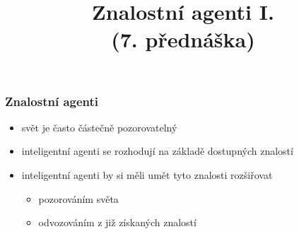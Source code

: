 \documentclass[red,professionalfont]{beamer}
\title[]{Znalostní agenti I.\\ (7. přednáška)}
\date[]{}
\theoremstyle{definition}
\newcommand{\0}{\mbox{${\bf 0}$}}
\begin{document}



\begin{frame}{} \titlepage
\end{frame}


% 

\begin{frame}\frametitle{Znalostní agenti}
\begin{itemize}
 \item svět je často částečně pozorovatelný\pause
 \item inteligentní agenti se rozhodují na základě dostupných znalostí\pause
 \item inteligentní agenti by si měli umět tyto znalosti rozšiřovat\pause
 \begin{itemize}
   \item pozorováním světa\pause
   \item odvozováním z již získaných znalostí
 \end{itemize}
\end{itemize}
\end{frame}
\end{document}
